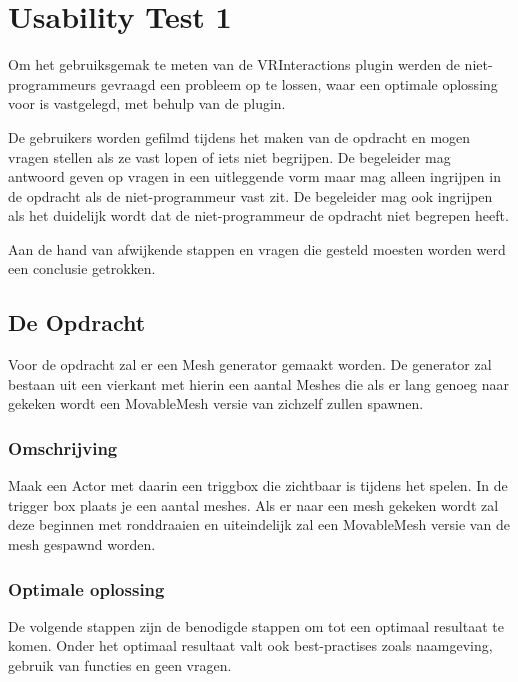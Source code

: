 
\chapter{Usability Test 1}
\label{appendix:usertest1}
\lhead{}

Om het gebruiksgemak te meten van de VRInteractions plugin werden de niet-programmeurs gevraagd een probleem op te lossen, waar een optimale oplossing voor is vastgelegd, met behulp van de plugin. 

De gebruikers worden gefilmd tijdens het maken van de opdracht en mogen vragen stellen als ze vast lopen of iets niet begrijpen. De begeleider mag antwoord geven op vragen in een uitleggende vorm maar mag alleen ingrijpen in de opdracht als de niet-programmeur vast zit. De begeleider mag ook ingrijpen als het duidelijk wordt dat de niet-programmeur de opdracht niet begrepen heeft.

Aan de hand van afwijkende stappen en vragen die gesteld moesten worden werd een conclusie getrokken.

\section{De Opdracht}
Voor de opdracht zal er een Mesh generator gemaakt worden. De generator zal bestaan uit een vierkant met hierin een aantal Meshes die als er lang genoeg naar gekeken wordt een MovableMesh versie van zichzelf zullen spawnen.

\subsection{Omschrijving}
Maak een Actor met daarin een triggbox die zichtbaar is tijdens het spelen. In de trigger box plaats je een aantal meshes. Als er naar een mesh gekeken wordt zal deze beginnen met ronddraaien en uiteindelijk zal een MovableMesh versie van de mesh gespawnd worden. 

\subsection{Optimale oplossing}
De volgende stappen zijn de benodigde stappen om tot een optimaal resultaat te komen. Onder het optimaal resultaat valt ook best-practises zoals naamgeving, gebruik van functies en geen vragen.

